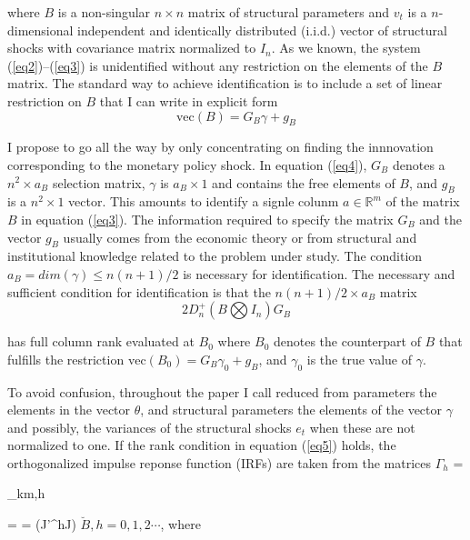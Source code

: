\documentclass[11pt,letterpaper]{article}
\begin{document}
	\noindent where $B$ is a non-singular $n \times n$ matrix of structural parameters and $v_{t}$ is a $n$-dimensional independent and identically distributed (i.i.d.) vector of structural shocks with covariance matrix normalized to $I_{n}$. As we known, the system (\ref{eq2})--(\ref{eq3}) is unidentified without any restriction on the elements of the $B$ matrix. The standard way to achieve identification is to include a set of linear restriction on $B$ that I can write in explicit form
	\begin{equation}\label{eq4}
		\mathrm{vec}(B) = G_{B} \gamma  + g_{B}
	\end{equation}

	I propose to go all the way by only concentrating on finding the innnovation corresponding to the monetary policy shock. In equation (\ref{eq4}), $G_{B}$ denotes a $n^2 \times a_{B}$ selection matrix, $\gamma$ is $a_{B} \times 1$ and contains the free elements of $B$, and $g_{B}$ is a $n^2 \times 1$ vector. This amounts to identify a signle colunm $a \in \mathbb{R}^{m}$ of the matrix $B$ in equation (\ref{eq3}). The information required to specify the matrix $G_{B}$ and the vector $g_{B}$ usually comes from the economic theory or from structural and institutional knowledge related to the problem under study. The condition $a_{B} = dim(\gamma)\leq n(n+1)/2$ is necessary for identification. The necessary and sufficient condition for identification is that the $n(n+1)/2 \times a_{B}$ matrix
	\begin{equation}\label{eq5}
		2D_{n}^{+}(B \bigotimes I_{n})G_{B}
	\end{equation}

	\noindent has full column rank evaluated at $B_{0}$ where $B_{0}$ denotes the counterpart of $B$ that fulfills the restriction $\mathrm{vec}(B_{0}) = G_{B} \gamma_{0} + g_{B}$, and $\gamma_{0}$ is the true value of $\gamma$. 
	
	To avoid confusion, throughout the paper I call reduced from parameters the elements in the vector $\theta$, and structural parameters the elements of the vector $\gamma$ and possibly, the variances of the structural shocks $e_{t}$ when these are not normalized to one. If the rank condition in equation (\ref{eq5}) holds, the orthogonalized impulse reponse function (IRFs) are taken from the matrices $\Gamma_{h}$ = \begin{bmatrix}
	\Psi_{km,h}\end{bmatrix} = \Phi {} = (J'^{h}J) $\breve{B}, h =0,1,2 \cdots$, where 
\end{document}
